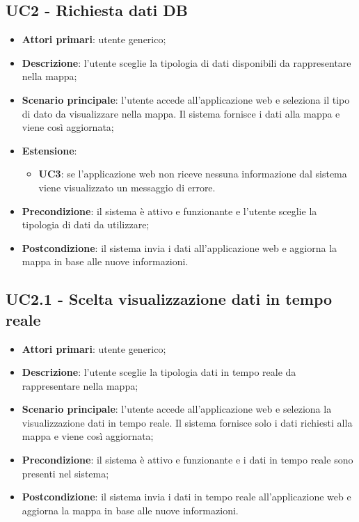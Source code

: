 \subsection{UC2 - Richiesta dati DB}
\begin{itemize}
	\item \textbf{Attori primari}: utente generico;
	\item \textbf{Descrizione}: l'utente sceglie la tipologia di dati disponibili da rappresentare nella mappa;
	\item \textbf{Scenario principale}: l'utente accede all'applicazione web e seleziona il tipo di dato da visualizzare nella mappa. Il sistema fornisce i dati alla mappa e viene così aggiornata;
	\item \textbf{Estensione}: 
	\begin{itemize}
		\item \textbf{UC3}: se l'applicazione web non riceve nessuna informazione dal sistema viene visualizzato un messaggio di errore.
	\end{itemize}
	\item \textbf{Precondizione}: il sistema è attivo e funzionante e l'utente sceglie la tipologia di dati da utilizzare;
	\item \textbf{Postcondizione}: il sistema invia i dati all'applicazione web e aggiorna la mappa in base alle nuove informazioni.
\end{itemize}

\subsection{UC2.1 - Scelta visualizzazione dati in tempo reale}
\begin{itemize}
	\item \textbf{Attori primari}: utente generico;
	\item \textbf{Descrizione}: l'utente sceglie la tipologia dati in tempo reale da rappresentare nella mappa;
	\item \textbf{Scenario principale}: l'utente accede all'applicazione web e seleziona la visualizzazione dati in tempo reale. Il sistema fornisce solo i dati richiesti alla mappa e viene così aggiornata;
	\item \textbf{Precondizione}: il sistema è attivo e funzionante e i dati in tempo reale sono presenti nel sistema;
	\item \textbf{Postcondizione}: il sistema invia i dati in tempo reale all'applicazione web e aggiorna la mappa in base alle nuove informazioni.
\end{itemize}

